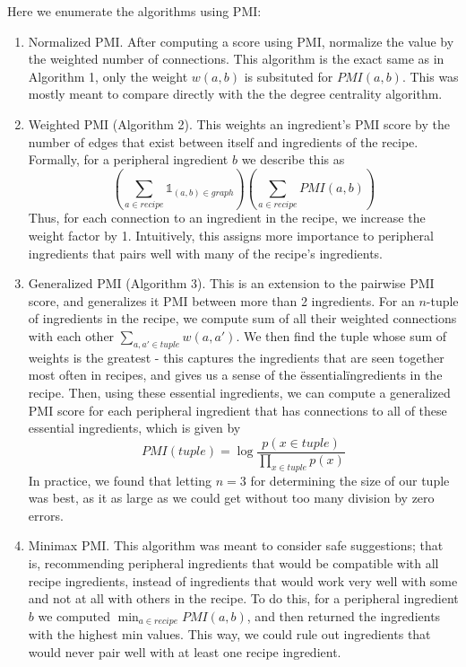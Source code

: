 \documentclass{acm_proc_article-sp}
\begin{document}
Here we enumerate the algorithms using PMI:
\begin{enumerate}
	\item Normalized PMI. After computing a score using PMI, normalize the value by the weighted number
	of connections. This algorithm is the exact same as in Algorithm 1, only the weight $w(a,b)$ is subsituted for $PMI(a,b)$. This was mostly meant to compare directly with the the degree centrality algorithm.
	\item Weighted PMI (Algorithm 2). This weights an ingredient's PMI score by the number of edges that exist between
	itself and ingredients of the recipe. Formally, for a peripheral ingredient $b$ we describe this as
	\[
		(\sum_{a \in recipe} \mathds{1}_{(a, b) \in graph})(\sum_{a \in recipe} PMI(a, b))
	\]
	Thus, for each connection to an ingredient in the recipe, we increase the weight factor by 1. Intuitively, this assigns more importance to peripheral ingredients
	that pairs well with many of the recipe's ingredients. 
	\item Generalized PMI (Algorithm 3). This is an extension to the pairwise PMI score, and generalizes it PMI between more than 2 ingredients. For an $n$-tuple of ingredients in the recipe, we compute sum of all their weighted connections with each other $\sum_{a, a' \in tuple} w(a,a')$. We then find the tuple whose
	sum of weights is the greatest - this captures the ingredients that are seen together most often in recipes,
	and gives us a sense of the \"essential\" ingredients in the recipe. Then, using these essential ingredients,
	we can compute a generalized PMI score for each peripheral ingredient that has connections to all of
	these essential ingredients, which is given by 
	\[
		PMI(tuple) = \log \frac{p(x \in tuple)}{\prod_{x \in tuple}p(x)}
	\]
	In practice, we found that letting $n = 3$ for determining the size of our tuple was best, as
	it as large as we could get without too many division by zero errors. 
	\item Minimax PMI. This algorithm was meant to consider safe suggestions; that is, recommending peripheral ingredients that would be compatible with all recipe ingredients, instead of ingredients
	that would work very well with some and not at all with others in the recipe. To do this,
	for a peripheral ingredient $b$ we computed $\min_{a \in recipe} PMI(a,b)$, and then 
	returned the ingredients with the highest min values. This way, we could rule out ingredients
	that would never pair well with at least one recipe ingredient.
\end{enumerate}
\end{document}

